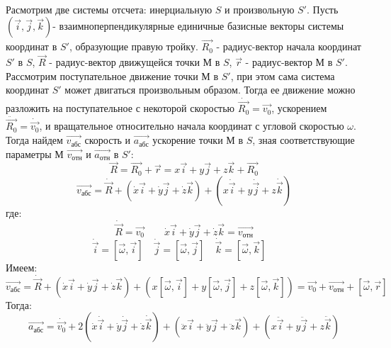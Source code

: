 \documentclass[a4paper, 12pt]{article}
\begin{document}
\paragraph{}
Расмотрим две системы отсчета: инерциальную $S$ и произвольную $S'$. Пусть $(\overrightarrow{i}, \overrightarrow{j}, \overrightarrow{k}) $- взаимноперпендикулярные единичные базисные векторы системы координат в $S'$, образующие правую тройку. $\overrightarrow{R_0}$ - радиус-вектор начала координат $S'$ в $S$, $\overrightarrow{R}$ - радиус-вектор движущейся точки М в $S$, $\overrightarrow{r}$ - радиус-вектор М в $S'$. Рассмотрим поступательное движение точки М в $S'$, при этом сама система координат $S'$ может двигаться произвольным образом. Тогда ее движение можно разложить на поступательное с некоторой скоростью $\dot{\overrightarrow{R_0}} = \overrightarrow{v_0}$, ускорением $\ddot{\overrightarrow{R_0}} = \dot{\overrightarrow{v_0}}$, и вращательное относительно начала координат с угловой скоростью $\omega$. Тогда найдем $\overrightarrow{v_{абс}}$ скорость и $\overrightarrow{a_{абс}}$ ускорение точки М в $S$, зная соответствующие параметры М $\overrightarrow{v_{отн}}$ и $\overrightarrow{a_{отн}}$ в $S'$:
\[ \overrightarrow{R} = \overrightarrow{R_0} + \overrightarrow{r} = x \overrightarrow{i} + y \overrightarrow{j} + z \overrightarrow{k} + \overrightarrow{R_0}  \]
\[ \overrightarrow{v_{абс}} = \dot{\overrightarrow{R}} + ( \dot{x}\overrightarrow{i} + \dot{y}\overrightarrow{j} + \dot{z}\overrightarrow{k} ) + ( x \dot{\overrightarrow{i}} + y\dot{\overrightarrow{j}} + z\dot{\overrightarrow{k}} )\]
где:
\[ \dot{\overrightarrow{R}} = \overrightarrow{v_0} \qquad
\dot{x}\overrightarrow{i} + \dot{y}\overrightarrow{j} + \dot{z}\overrightarrow{k} = \overrightarrow{v_{отн}}\]
\[ \dot{\overrightarrow{i}} = [\overrightarrow{\omega}, \overrightarrow{i} ] \quad  \dot{\overrightarrow{j}} = [\overrightarrow{\omega}, \overrightarrow{j} ] \quad \dot{\overrightarrow{k}} = [\overrightarrow{\omega}, \overrightarrow{k} ] \quad\]
Имеем:
\[ \overrightarrow{v_{абс}} = \dot{\overrightarrow{R}} + ( \dot{x}\overrightarrow{i} + \dot{y}\overrightarrow{j} + \dot{z}\overrightarrow{k} ) + ( x[\overrightarrow{\omega}, \overrightarrow{i} ] + y[\overrightarrow{\omega}, \overrightarrow{j} ] + z[\overrightarrow{\omega}, \overrightarrow{k} ]  ) = \overrightarrow{v_0} + \overrightarrow{v_{отн}} + [\overrightarrow{\omega}, \overrightarrow{r} ]\]
Тогда:
\[ \overrightarrow{a_{абс}} = \dot{\overrightarrow{v_0}} + 2( \dot{x}\dot{\overrightarrow{i}} + \dot{y}\dot{\overrightarrow{j}} + \dot{z}\dot{\overrightarrow{k}} ) + ( \ddot{x}\overrightarrow{i} + \ddot{y}\overrightarrow{j} + \ddot{z}\overrightarrow{k} ) + ( x \ddot{\overrightarrow{i}} + y\ddot{\overrightarrow{j}} + z\ddot{\overrightarrow{k}} )\]
\end{document}
